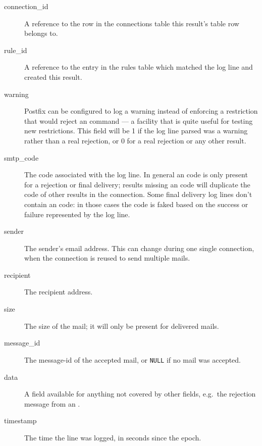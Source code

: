 \documentclass[a4paper,12pt,draft]{article}
\begin{document}
\begin{description}

    \item [connection\_id] A reference to the row in the connections table
        this result's table row belongs to.

    \item [rule\_id] A reference to the entry in the rules table which
        matched the log line and created this result.

    \item [warning] Postfix can be configured to log a warning instead of
        enforcing a restriction that would reject an \SMTP{} command --- a
        facility that is quite useful for testing new restrictions.  This
        field will be 1 if the log line parsed was a warning rather than a
        real rejection, or 0 for a real rejection or any other result.

    \item [smtp\_code] The \SMTP{} code associated with the log line.  In
        general an \SMTP{} code is only present for a rejection or final
        delivery; results missing an \SMTP{} code will duplicate the
        \SMTP{} code of other results in the connection.  Some final
        delivery log lines don't contain an \SMTP{} code: in those cases
        the code is faked based on the success or failure represented by
        the log line.

    \item [sender] The sender's email address.  This can change during one
        single connection, when the connection is reused to send multiple
        mails.

    \item [recipient] The recipient address.

    \item [size] The size of the mail; it will only be present for
        delivered mails.

    \item [message\_id] The message-id of the accepted mail, or
        \texttt{NULL} if no mail was accepted.

    \item [data] A field available for anything not covered by other
        fields, e.g.\ the rejection message from an \RBL{}\@.

    \item [timestamp] The time the line was logged, in seconds since the
        epoch.

\end{description}
\end{document}
